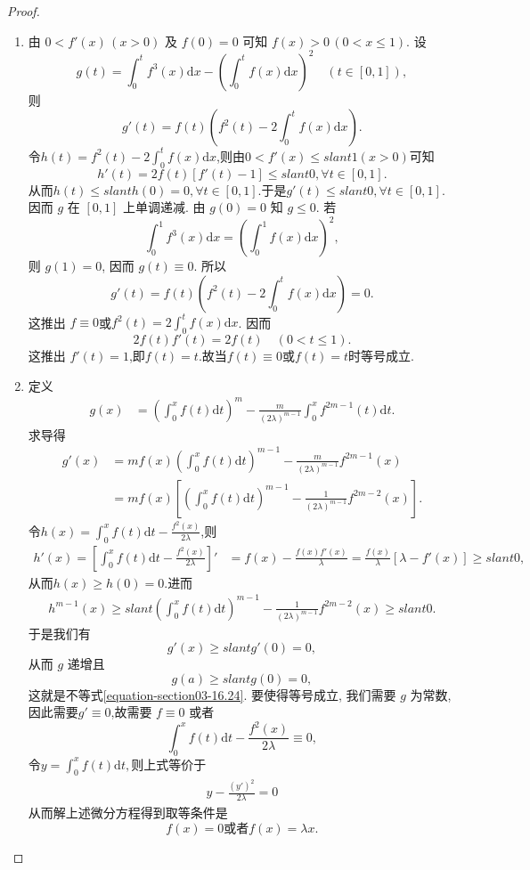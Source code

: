 \documentclass[../../main.tex]{subfiles}
\begin{document}
\begin{proof}
\begin{enumerate}
\item 由 $0<f'(x)\,(x>0)$ 及 $f(0)=0$ 可知 $f(x)>0\,(0<x\leqslant 1)$. 设
$$g(t)=\int_0^t f^3(x)\mathrm{d}x-\left(\int_0^t f(x)\mathrm{d}x\right)^2\quad(t\in[0,1]),$$
则
$$g'(t)=f(t)\left(f^2(t)-2\int_0^t f(x)\mathrm{d}x\right).$$
令$h(t)=f^2(t)-2\int_0^t f(x)\mathrm{d}x$,则由$0<f'(x)\leqslant slant 1(x>0)$可知
\[
h' \left( t \right) =2f\left( t \right) \left[ f' \left( t \right) -1 \right] \leqslant slant 0,\forall t\in \left[ 0,1 \right] .
\]
从而$h(t)\leqslant slant h(0)=0,\forall t\in \left[ 0,1 \right] $.于是$g'(t)\leqslant slant 0,\forall t\in \left[ 0,1 \right]$.
因而 $g$ 在 $[0,1]$ 上单调递减. 由 $g(0)=0$ 知 $g\leqslant 0$. 若
$$\int_0^1 f^3(x)\mathrm{d}x=\left(\int_0^1 f(x)\mathrm{d}x\right)^2,$$
则 $g(1)=0$, 因而 $g(t)\equiv0$. 所以
$$g'(t)=f(t)\left(f^2(t)-2\int_0^t f(x)\mathrm{d}x\right)=0.$$
这推出 $f\equiv 0$或$f^2(t)=2\int_0^t f(x)\mathrm{d}x$. 因而
$$2f(t)f'(t)=2f(t)\quad(0<t\leqslant 1).$$
这推出 $f'(t)=1$,即$f(t)=t$.故当$f(t)\equiv 0$或$f(t)=t$时等号成立.

\item 定义
\begin{align*}
g(x) &= \left(\int_{0}^{x}f(t)\mathrm{d}t\right)^m - \frac{m}{(2\lambda)^{m - 1}}\int_{0}^{x}f^{2m - 1}(t)\mathrm{d}t.
\end{align*}
求导得
\begin{align*}
g'(x) &= mf(x)\left(\int_{0}^{x}f(t)\mathrm{d}t\right)^{m - 1} - \frac{m}{(2\lambda)^{m - 1}}f^{2m - 1}(x)\\
&= mf(x)\left[\left(\int_{0}^{x}f(t)\mathrm{d}t\right)^{m - 1} - \frac{1}{(2\lambda)^{m - 1}}f^{2m - 2}(x)\right].
\end{align*}
令$h(x)=\int_{0}^{x}f(t)\mathrm{d}t - \frac{f^2(x)}{2\lambda}$,则
\begin{align*}
h'(x)=\left[\int_{0}^{x}f(t)\mathrm{d}t - \frac{f^2(x)}{2\lambda}\right]' &= f(x) - \frac{f(x)f'(x)}{\lambda} = \frac{f(x)}{\lambda}[\lambda - f'(x)] \geqslant slant 0,
\end{align*}
从而$h(x)\geqslant  h(0)=0.$进而
\begin{align*}
h^{m-1}(x)\geqslant slant \left(\int_{0}^{x}f(t)\mathrm{d}t\right)^{m - 1} - \frac{1}{(2\lambda)^{m - 1}}f^{2m - 2}(x)\geqslant slant 0.
\end{align*}
于是我们有
\[g'(x) \geqslant slant g'(0) = 0,\]
从而 $g$ 递增且
\[g(a) \geqslant slant g(0) = 0,\]
这就是不等式\eqref{equation-section03-16.24}.
要使得等号成立, 我们需要 $g$ 为常数, 因此需要$g'\equiv 0$,故需要 $f \equiv 0$ 或者
\[\int_{0}^{x}f(t)\mathrm{d}t - \frac{f^2(x)}{2\lambda} \equiv 0,\]
令$y=\int_{0}^{x}f(t)\mathrm{d}t,$则上式等价于
\begin{align*}
y-\frac{(y')^2}{2\lambda}=0
\end{align*}
从而解上述微分方程得到取等条件是
\[f(x) = 0\text{或者}f(x) = \lambda x.\]
\end{enumerate}
\end{proof}
\end{document}
